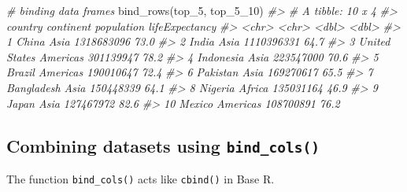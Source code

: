 \documentclass[
]{book}
\newenvironment{Shaded}{\begin{snugshade}}{\end{snugshade}}
\newcommand{\CommentTok}[1]{\textcolor[rgb]{0.56,0.35,0.01}{\textit{#1}}}
\newcommand{\FunctionTok}[1]{\textcolor[rgb]{0.00,0.00,0.00}{#1}}
\newcommand{\NormalTok}[1]{#1}
\begin{document}
\begin{Shaded}
\begin{Highlighting}[]
\CommentTok{\# binding data frames}
\FunctionTok{bind\_rows}\NormalTok{(top\_5, top\_5\_10)}
\CommentTok{\#\textgreater{} \# A tibble: 10 x 4}
\CommentTok{\#\textgreater{}    country       continent population lifeExpectancy}
\CommentTok{\#\textgreater{}    \textless{}chr\textgreater{}         \textless{}chr\textgreater{}          \textless{}dbl\textgreater{}          \textless{}dbl\textgreater{}}
\CommentTok{\#\textgreater{}  1 China         Asia      1318683096           73.0}
\CommentTok{\#\textgreater{}  2 India         Asia      1110396331           64.7}
\CommentTok{\#\textgreater{}  3 United States Americas   301139947           78.2}
\CommentTok{\#\textgreater{}  4 Indonesia     Asia       223547000           70.6}
\CommentTok{\#\textgreater{}  5 Brazil        Americas   190010647           72.4}
\CommentTok{\#\textgreater{}  6 Pakistan      Asia       169270617           65.5}
\CommentTok{\#\textgreater{}  7 Bangladesh    Asia       150448339           64.1}
\CommentTok{\#\textgreater{}  8 Nigeria       Africa     135031164           46.9}
\CommentTok{\#\textgreater{}  9 Japan         Asia       127467972           82.6}
\CommentTok{\#\textgreater{} 10 Mexico        Americas   108700891           76.2}
\end{Highlighting}
\end{Shaded}

\hypertarget{combining-datasets-using-bind_cols}{%
\subsection{\texorpdfstring{Combining datasets using \texttt{bind\_cols()}}{Combining datasets using bind\_cols()}}\label{combining-datasets-using-bind_cols}}

The function \texttt{bind\_cols()} acts like \texttt{cbind()} in Base R.
\end{document}
